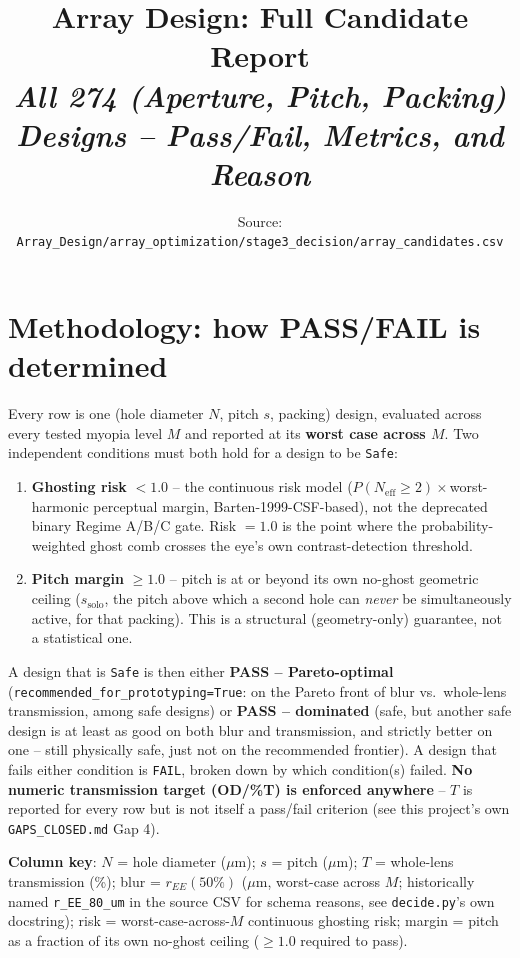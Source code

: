 \documentclass[9pt]{article}
\title{\textbf{\Huge Array Design: Full Candidate Report}\\[0.3cm]
\large\itshape All 274 (Aperture, Pitch, Packing) Designs -- Pass/Fail, Metrics, and Reason}
\author{}
\date{Source: \texttt{Array\_Design/array\_optimization/stage3\_decision/array\_candidates.csv}}
\newcommand{\Neff}{N_{\text{eff}}}
\begin{document}
\maketitle

\section*{Methodology: how PASS/FAIL is determined}
Every row is one (hole diameter $N$, pitch $s$, packing) design, evaluated across every
tested myopia level $M$ and reported at its \textbf{worst case across $M$}. Two independent
conditions must both hold for a design to be \texttt{Safe}:
\begin{enumerate}
\item \textbf{Ghosting risk} $<1.0$ -- the continuous risk model
($P(\Neff\geq2)\times$worst-harmonic perceptual margin, Barten-1999-CSF-based), not the
deprecated binary Regime A/B/C gate. Risk $=1.0$ is the point where the probability-weighted
ghost comb crosses the eye's own contrast-detection threshold.
\item \textbf{Pitch margin} $\geq1.0$ -- pitch is at or beyond its own no-ghost geometric
ceiling ($s_{\text{solo}}$, the pitch above which a second hole can \emph{never} be
simultaneously active, for that packing). This is a structural (geometry-only) guarantee,
not a statistical one.
\end{enumerate}
A design that is \texttt{Safe} is then either \textbf{PASS -- Pareto-optimal}
(\texttt{recommended\_for\_prototyping=True}: on the Pareto front of blur vs.\ whole-lens
transmission, among safe designs) or \textbf{PASS -- dominated} (safe, but another safe
design is at least as good on both blur and transmission, and strictly better on one --
still physically safe, just not on the recommended frontier). A design that fails either
condition is \texttt{FAIL}, broken down by which condition(s) failed. \textbf{No numeric
transmission target (OD/\%T) is enforced anywhere} -- $T$ is reported for every row but is
not itself a pass/fail criterion (see this project's own \texttt{GAPS\_CLOSED.md} Gap 4).

\textbf{Column key}: $N$ = hole diameter ($\mu$m); $s$ = pitch ($\mu$m); $T$ = whole-lens
transmission (\%); blur = $r_{EE}(50\%)$ ($\mu$m, worst-case across $M$; historically named
\texttt{r\_EE\_80\_um} in the source CSV for schema reasons, see \texttt{decide.py}'s own
docstring); risk = worst-case-across-$M$ continuous ghosting risk; margin = pitch as a
fraction of its own no-ghost ceiling ($\geq1.0$ required to pass).
\end{document}

